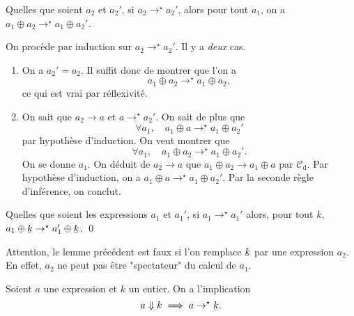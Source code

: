 \documentclass[../main]{subfiles}
\begin{document}
  \begin{lem} \label{lem:petit-pas-trans-compose}
    Quelles que soient $a_2$ et $a_2'$, si $a_2 \to^\star a_2'$, alors pour tout $a_1$, on a $a_1 \oplus a_2 \to^\star a_1 \oplus a_2'$.
  \end{lem}
  \begin{prv}
    On procède par induction sur $a_2 \to^\star a_2'$.
    Il y a \textit{deux} cas.
    \begin{enumerate}
      \item On a $a_2' = a_2$.
        Il suffit donc de montrer que l'on a \[a_1 \oplus a_2 \to^\star a_1 \oplus a_2,\] ce qui est vrai par réflexivité.
      \item On sait que $a_2 \to a$ et $a \to^\star a_2'$.
        On sait de plus que \[
        \forall a_1, \quad a_1 \oplus a \to^\star a_1 \oplus a_2'
        \] par hypothèse d'induction.
        On veut montrer que \[
        \forall a_1, \quad a_1 \oplus a_2 \to^\star a_1 \oplus a_2'
        .\]
        On se donne $a_1$.
        On déduit de $a_2 \to a$ que $a_1 \oplus a_2 \to a_1 \oplus a$ par $\mathcal{C}_\mathrm{d}$.
        Par hypothèse d'induction, on a $a_1 \oplus a \to^\star a_1 \oplus a_2'$.
        Par la seconde règle d'inférence, on conclut.
    \end{enumerate}
  \end{prv}

  \begin{lem}\label{lem:petit-pas-trans-plus}
    Quelles que soient les expressions $a_1$ et $a_1'$, si $a_1 \to^\star a_1'$ alors, pour tout $k$, $a_1 \oplus \ubar k \to^\star a_1' \oplus \ubar k$.
    \qed
  \end{lem}

  Attention, le lemme précédent est faux si l'on remplace $\ubar k$ par une expression $a_2$.
  En effet, $a_2$ ne peut pas être "spectateur" du calcul de $a_1$.

  \begin{prop}
    Soient $a$ une expression et $k$ un entier.
    On a l'implication \[
    a \Downarrow k \implies a \to^\star \ubar k
    .\]
  \end{prop}
\end{document}
